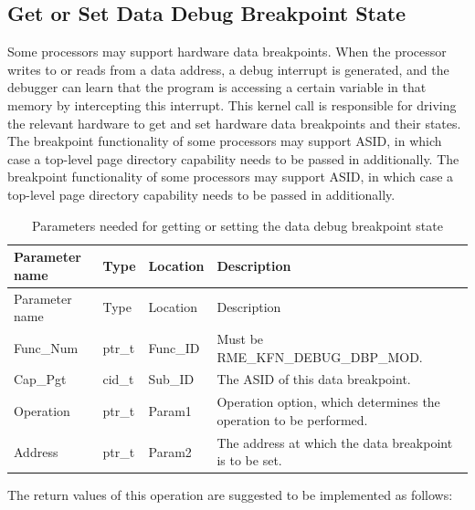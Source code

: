 \subsection{Get or Set Data Debug Breakpoint State}\label{subsec:8-get-or-set-data-breakpoint-state}

Some processors may support hardware data breakpoints. When the processor writes to or reads from a data address, a debug interrupt is generated, and the debugger can learn that the program is accessing a certain variable in that memory by intercepting this interrupt. This kernel call is responsible for driving the relevant hardware to get and set hardware data breakpoints and their states. The breakpoint functionality of some processors may support ASID, in which case a top-level page directory capability needs to be passed in additionally. The breakpoint functionality of some processors may support ASID, in which case a top-level page directory capability needs to be passed in additionally.

\begin{xltabular}{\textwidth}{@{}>{\hsize\raggedright\arraybackslash}X>{\hsize\raggedright\arraybackslash}X>{\hsize\raggedright\arraybackslash}X>{\hsize\raggedright\arraybackslash}X@{}}
\caption{Parameters needed for getting or setting the data debug breakpoint state}\label{tab:8-121-get-or-set-data-breakpoint-state-parameters}\\
\toprule
Parameter name & Type & Location & Description\tabularnewline
\endfirsthead
\toprule
Parameter name & Type & Location & Description\tabularnewline
\midrule
\endhead
\bottomrule
\endlastfoot
Func\_Num & ptr\_t & Func\_ID & Must be RME\_KFN\_DEBUG\_DBP\_MOD.\tabularnewline
Cap\_Pgt & cid\_t & Sub\_ID & The ASID of this data breakpoint.\tabularnewline
Operation & ptr\_t & Param1 &
Operation option, which determines the operation to be performed.\tabularnewline
Address & ptr\_t & Param2 & The address at which the data breakpoint is to be set.\tabularnewline
\end{xltabular}
\nopagebreak[4]

\newpage
{}
The return values of this operation are suggested to be implemented as follows:

